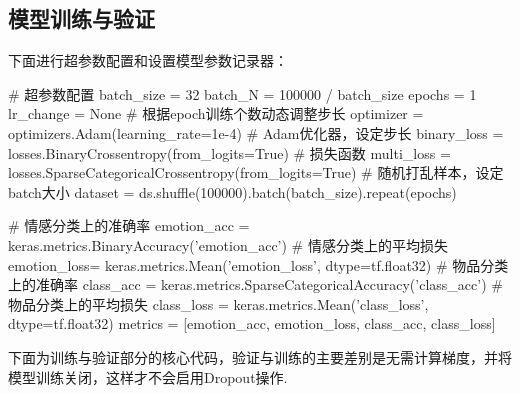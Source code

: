\documentclass[12pt, a4paper, oneside]{ctexart}
\numberwithin{equation}{section}  %
\begin{document}
\subsection{模型训练与验证}
下面进行超参数配置和设置模型参数记录器：
\begin{pythoncode}
# 超参数配置
batch_size = 32
batch_N = 100000 / batch_size
epochs = 1
lr_change = None  # 根据epoch训练个数动态调整步长
optimizer = optimizers.Adam(learning_rate=1e-4)  # Adam优化器，设定步长
binary_loss = losses.BinaryCrossentropy(from_logits=True)  # 损失函数
multi_loss = losses.SparseCategoricalCrossentropy(from_logits=True)
# 随机打乱样本，设定batch大小
dataset = ds.shuffle(100000).batch(batch_size).repeat(epochs)

# 情感分类上的准确率
emotion_acc = keras.metrics.BinaryAccuracy('emotion_acc')
# 情感分类上的平均损失
emotion_loss= keras.metrics.Mean('emotion_loss', dtype=tf.float32)
# 物品分类上的准确率
class_acc = keras.metrics.SparseCategoricalAccuracy('class_acc')
# 物品分类上的平均损失
class_loss = keras.metrics.Mean('class_loss', dtype=tf.float32)
metrics = [emotion_acc, emotion_loss, class_acc, class_loss]
\end{pythoncode}
下面为训练与验证部分的核心代码，验证与训练的主要差别是无需计算梯度，并将模型训练关闭，这样才不会启用Dropout操作.
\end{document}
